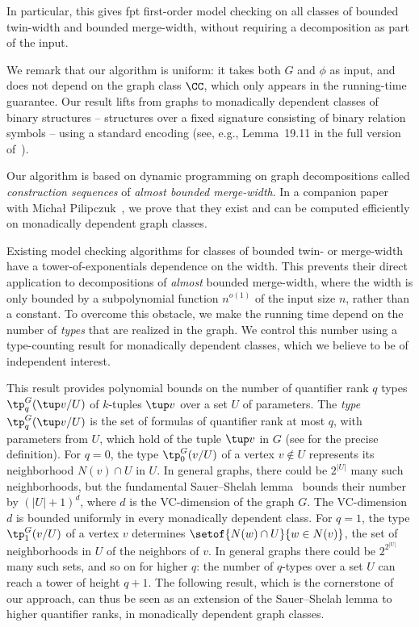 In particular, this gives fpt first-order model checking on all classes of bounded twin-width and bounded merge-width, without requiring a decomposition as part of the input.

We remark that our algorithm is uniform:
it takes both $G$ and $\phi$ as input, and does not depend on the graph class $\CC$, which only appears in the running-time guarantee.
Our result lifts from graphs to monadically dependent classes of binary structures -- structures over a fixed signature consisting of binary relation symbols -- using a standard encoding (see, e.g., Lemma~19.11 in the full version of~\cite{flip-breakability}).

\medskip
Our algorithm is based on dynamic programming on graph decompositions called \emph{construction sequences} of \emph{almost bounded merge-width}.
In a companion paper with Michał Pilipczuk~\cite{md-abmw}, we prove that they exist and can be computed efficiently on monadically dependent graph classes.

Existing model checking algorithms for classes of bounded twin- or merge-width have a tower-of-exponentials dependence on the width. This prevents their direct application to decompositions of \emph{almost} bounded merge-width, where the width is only bounded by a subpolynomial function $n^{o(1)}$ of the input size $n$, rather than a constant.
To overcome this obstacle, we make the running time depend on the number of \emph{types} that are realized in the graph. We control this number using a type-counting result for monadically dependent classes, which we believe to be of independent interest.

This result provides polynomial bounds on the number of quantifier rank $q$ types $\tp_q^G(\tup v/U)$ of $k$-tuples $\tup v$ over a set $U$ of parameters.
The \emph{type} $\tp_q^G(\tup v/U)$ is the set of formulas of quantifier rank at most \(q\), with parameters from \(U\), which hold of the tuple $\tup v$ in $G$
(see  for the precise definition).
For $q=0$, the type $\tp_0^G(v/U)$ of a vertex $v\notin U$ represents its neighborhood $N(v)\cap U$ in $U$.
In general graphs, there could be $2^{|U|}$ many such neighborhoods, but the fundamental Sauer--Shelah lemma~\cite{Sauer72,She72} bounds their number by $(|U|+1)^d$, where $d$ is the VC-dimension of the graph $G$.
The VC-dimension $d$ is bounded uniformly in every monadically dependent class.
For $q=1$, the type $\tp_1^G(v/U)$ of a vertex $v$
determines $\setof{N(w)\cap U}{w\in N(v)}$, the set of neighborhoods in $U$ of the neighbors of $v$. In general graphs there could be
$2^{2^{|U|}}$ many such sets, and so on for higher $q$: the number of $q$-types over a set $U$ can reach a tower of height $q+1$.
The following result, which is the cornerstone of our approach, can thus be seen as an extension of the Sauer--Shelah lemma to higher quantifier ranks, in monadically dependent graph classes.

